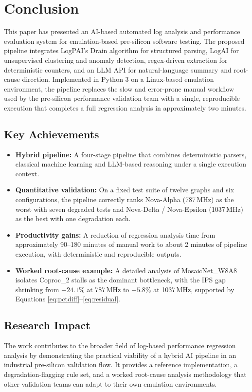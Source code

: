 \documentclass[conference]{IEEEtran}
\begin{document}
\section{Conclusion}

This paper has presented an AI-based automated log analysis and performance evaluation system for emulation-based pre-silicon software testing. The proposed pipeline integrates LogPAI's Drain algorithm for structured parsing, LogAI for unsupervised clustering and anomaly detection, regex-driven extraction for deterministic counters, and an LLM API for natural-language summary and root-cause direction. Implemented in Python 3 on a Linux-based emulation environment, the pipeline replaces the slow and error-prone manual workflow used by the pre-silicon performance validation team with a single, reproducible execution that completes a full regression analysis in approximately two minutes.

\subsection{Key Achievements}
\begin{itemize}
\item \textbf{Hybrid pipeline:} A four-stage pipeline that combines deterministic parsers, classical machine learning and LLM-based reasoning under a single execution context.
\item \textbf{Quantitative validation:} On a fixed test suite of twelve graphs and six configurations, the pipeline correctly ranks Nova-Alpha (787\,MHz) as the worst with seven degraded tests and Nova-Delta / Nova-Epsilon (1037\,MHz) as the best with one degradation each.
\item \textbf{Productivity gains:} A reduction of regression analysis time from approximately 90--180 minutes of manual work to about 2 minutes of pipeline execution, with deterministic and reproducible outputs.
\item \textbf{Worked root-cause example:} A detailed analysis of MosaicNet\_W8A8 isolates Coproc\_2 stalls as the dominant bottleneck, with the IPS gap shrinking from $-24.1\%$ at 787\,MHz to $-5.8\%$ at 1037\,MHz, supported by Equations \ref{eq:pctdiff}--\ref{eq:residual}.
\end{itemize}

\subsection{Research Impact}
The work contributes to the broader field of log-based performance regression analysis by demonstrating the practical viability of a hybrid AI pipeline in an industrial pre-silicon validation flow. It provides a reference implementation, a degradation-flagging rule set, and a worked root-cause analysis methodology that other validation teams can adapt to their own emulation environments.
\end{document}
